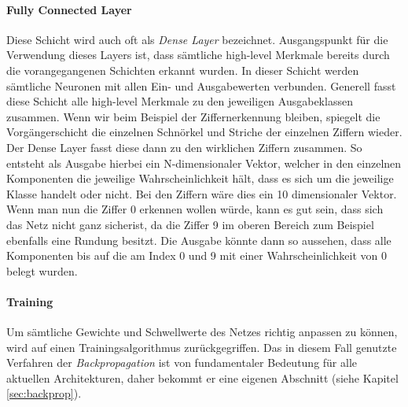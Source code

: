 \paragraph{Fully Connected Layer}
Diese Schicht wird auch oft als \emph{Dense Layer} bezeichnet. Ausgangspunkt für die Verwendung dieses Layers ist, dass sämtliche high-level Merkmale bereits durch die vorangegangenen Schichten erkannt wurden. In dieser Schicht werden sämtliche Neuronen mit allen Ein- und Ausgabewerten verbunden. Generell fasst diese Schicht alle high-level Merkmale zu den jeweiligen Ausgabeklassen zusammen. Wenn wir beim Beispiel der Ziffernerkennung bleiben, spiegelt die Vorgängerschicht die einzelnen Schnörkel und Striche der einzelnen Ziffern wieder. Der Dense Layer fasst diese dann zu den wirklichen Ziffern zusammen. So entsteht als Ausgabe hierbei ein N-dimensionaler Vektor, welcher in den einzelnen Komponenten die jeweilige Wahrscheinlichkeit hält, dass es sich um die jeweilige Klasse handelt oder nicht. Bei den Ziffern wäre dies ein 10 dimensionaler Vektor. Wenn man nun die Ziffer 0 erkennen wollen würde, kann es gut sein, dass sich das Netz \glqq nicht ganz sicher\grqq  ist, da die Ziffer 9 im oberen Bereich zum Beispiel ebenfalls eine Rundung besitzt. Die Ausgabe könnte dann so aussehen, dass alle Komponenten bis auf die am Index 0 und 9 mit einer Wahrscheinlichkeit von 0 belegt wurden. 

\paragraph{Training} 
Um sämtliche Gewichte und Schwellwerte des Netzes richtig anpassen zu können, wird auf einen Trainingsalgorithmus zurückgegriffen. Das in diesem Fall genutzte Verfahren der \emph{Backpropagation} ist von fundamentaler Bedeutung für alle aktuellen Architekturen, daher bekommt er eine eigenen Abschnitt (siehe Kapitel \ref{sec:backprop}). 
